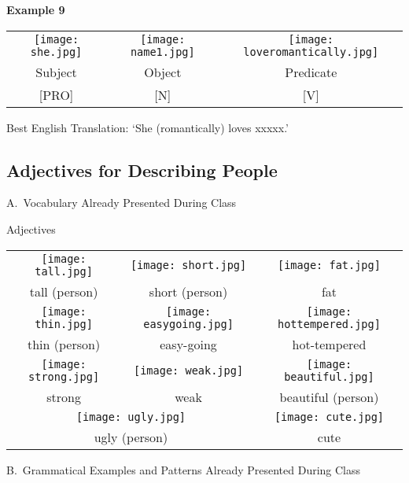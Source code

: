 \documentclass{tufte-book}
\begin{document}
\vspace{0.25cm}\noindent \textbf{Example 9}
\begin{table*}[h!]
\begin{tabular}{c | c | c}
\texttt{[image: she.jpg]}&\texttt{[image: name1.jpg]}&\texttt{[image: loveromantically.jpg]}\\
\footnotesize Subject & \footnotesize Object &  \footnotesize Predicate\\
\footnotesize [PRO] & \footnotesize [N] & \footnotesize [V]\\
\end{tabular}
\end{table*}

Best English Translation: `She (romantically) loves xxxxx.'
\newpage
\subsection{Adjectives for Describing People}

\noindent A.~Vocabulary Already Presented During Class

\vspace{0.25cm} \noindent Adjectives

\begin{table*}[h!]
\begin{tabular}{c c c }
\texttt{[image: tall.jpg]}&\texttt{[image: short.jpg]}&\texttt{[image: fat.jpg]}\\
\footnotesize tall (person) & \footnotesize short (person) & \footnotesize fat\\
\texttt{[image: thin.jpg]}&\texttt{[image: easygoing.jpg]}&\texttt{[image: hottempered.jpg]}\\
\footnotesize thin (person) & \footnotesize easy-going & \footnotesize hot-tempered\\
\texttt{[image: strong.jpg]}&\texttt{[image: weak.jpg]}&\texttt{[image: beautiful.jpg]}\\
\footnotesize strong & \footnotesize weak & \footnotesize beautiful (person)\\
\multicolumn{2}{c}{\texttt{[image: ugly.jpg]}}&\texttt{[image: cute.jpg]}\\
\multicolumn{2}{c}{\footnotesize ugly (person)} & \footnotesize cute\\

\end{tabular}
\end{table*}
\newpage
\noindent B.~Grammatical Examples and Patterns Already Presented During Class
\end{document}
